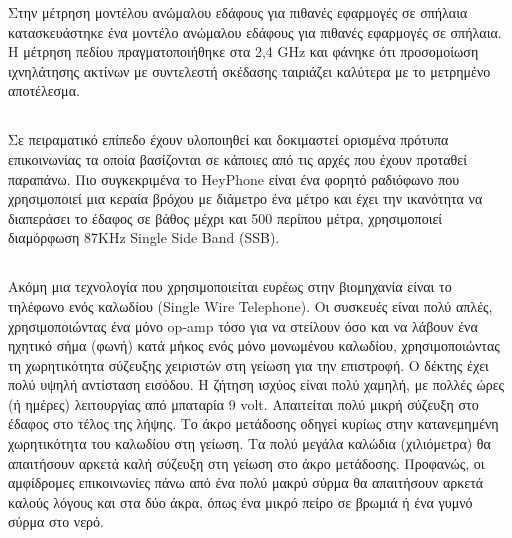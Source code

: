 \documentclass[12pt]{article}
\begin{document}
\begin{multicols*}{2}
        Στην μέτρηση μοντέλου ανώμαλου εδάφους για πιθανές εφαρμογές σε σπήλαια \cite{soo_measurement_2019}
        κατασκευάστηκε ένα μοντέλο ανώμαλου εδάφους για πιθανές εφαρμογές σε σπήλαια. Η μέτρηση πεδίου
        πραγματοποιήθηκε στα 2,4 GHz και φάνηκε ότι προσομοίωση ιχνηλάτησης ακτίνων με συντελεστή 
        σκέδασης ταιριάζει καλύτερα με το μετρημένο αποτέλεσμα.

    \subsection{}
        Σε πειραματικό επίπεδο έχουν υλοποιηθεί και δοκιμαστεί ορισμένα πρότυπα επικοινωνίας
        τα οποία βασίζονται σε κάποιες από τις αρχές που έχουν προταθεί παραπάνω. Πιο
        συγκεκριμένα το HeyPhone είναι ένα φορητό ραδιόφωνο που χρησιμοποιεί μια κεραία βρόχου
        με διάμετρο ένα μέτρο και έχει την ικανότητα να διαπεράσει το έδαφος σε βάθος μέχρι
        και 500 περίπου μέτρα, χρησιμοποιεί διαμόρφωση 87KHz Single Side Band (SSB).

    \subsection{}
        Ακόμη μια τεχνολογία που χρησιμοποιείται ευρέως στην βιομηχανία είναι το τηλέφωνο
        ενός καλωδίου (Single Wire Telephone). Οι συσκευές είναι πολύ απλές, χρησιμοποιώντας
        ένα μόνο op-amp τόσο για να στείλουν όσο και να λάβουν ένα ηχητικό σήμα (φωνή) κατά
        μήκος ενός μόνο μονωμένου καλωδίου, χρησιμοποιώντας τη χωρητικότητα σύζευξης χειριστών
        στη γείωση για την επιστροφή. Ο δέκτης έχει πολύ υψηλή αντίσταση εισόδου. Η ζήτηση
        ισχύος είναι πολύ χαμηλή, με πολλές ώρες (ή ημέρες) λειτουργίας από μπαταρία 9 volt.
        Απαιτείται πολύ μικρή σύζευξη στο έδαφος στο τέλος της λήψης. Το άκρο μετάδοσης οδηγεί
        κυρίως στην κατανεμημένη χωρητικότητα του καλωδίου στη γείωση. Τα πολύ μεγάλα καλώδια
        (χιλιόμετρα) θα απαιτήσουν αρκετά καλή σύζευξη στη γείωση στο άκρο μετάδοσης.
        Προφανώς, οι αμφίδρομες επικοινωνίες πάνω από ένα πολύ μακρύ σύρμα θα απαιτήσουν
        αρκετά καλούς λόγους και στα δύο άκρα, όπως ένα μικρό πείρο σε βρωμιά ή ένα γυμνό
        σύρμα στο νερό.

    \printbibliography
\end{multicols*}
\end{document}
